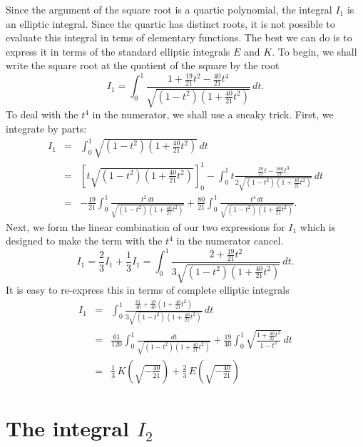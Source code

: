\documentclass[12pt]{article}
\begin{document}
Since the argument of the square root is a quartic polynomial, the integral $I_1$ is an elliptic integral.  Since the quartic has distinct roots, it is not possible to evaluate this integral in tems of elementary functions.  The best we can do is to express it in terms of the standard elliptic integrals $E$ and $K$.  To begin, we shall write the square root at the quotient of the square by the root
$$ I_1 = \int_0^1 \frac{1 + \frac{19}{21} t^2 - \frac{40}{21} t^4}
{\sqrt{\left( 1 - t^2 \right) \left( 1 + \frac{40}{21} t^2 \right)}} \, dt.$$
To deal with the $t^4$ in the numerator, we shall use a sneaky trick.  First, we integrate by parts:
\begin{eqnarray*}
I_1 &=& \int_0^1 \sqrt{\left( 1 - t^2 \right) \left( 1 + \frac{40}{21} 
t^2 \right)} \, dt \\
&=& \left[ t \sqrt{\left( 1 - t^2 \right) \left( 1 + \frac{40}{21} t^2 \right)}
\right]_0^1 - \int_0^1 t \frac{\frac{38}{21} t - \frac{160}{21} t^3}{2\sqrt{\left( 1 - t^2 \right) \left( 1 + \frac{40}{21} t^2 \right)}} \, dt \\
 &=& - \frac{19}{21} \int_0^1 \frac{t^2 \, dt}{\sqrt{\left( 1 - t^2 \right) \left( 1 + \frac{40}{21} t^2 \right)}} + 
\frac{80}{21} \int_0^1 \frac{t^4 \, dt}{\sqrt{\left( 1 - t^2 \right) \left( 1 + \frac{40}{21} t^2 \right)}}.
\end{eqnarray*}
Next, we form the linear combination of our two expressions for $I_1$ which is designed to make the term with the $t^4$ in the numerator cancel.
 $$I_1 = \frac{2}{3} I_1 + \frac {1}{3} I_1 = \int_0^1 \frac{2 + \frac{19}{21} t^2}{3 \sqrt{ \left( 1 - t^2 \right) \left( 1 + \frac{40}{21} t^2 \right)}} \, dt.$$
It is easy to re-express this in terms of complete elliptic integrals
\begin{eqnarray*}
I_1 &=& \int_0^1 \frac{\frac{61}{40} + \frac{19}{40} \left( 1 + \frac{40}{21} t^2 \right)}{3 \sqrt{ \left( 1 - t^2 \right) \left( 1 + \frac{40}{21} t^2 \right)}} \, dt \\
&=&  \frac{61}{120} \int_0^1 \frac{dt}{\sqrt{\left( 1 - t^2 \right) \left( 1 + \frac{40}{21} t^2 \right)}} + \frac{19}{40} \int_0^1 \sqrt{\frac{1 + \frac{40}{21} t^2}{1 - t^2}} \, dt \\
&=& \frac{1}{3} \, K \left( \sqrt{-\frac{40}{21}} \right) + \frac{2}{3} \, E \left( \sqrt{-\frac{40}{21}} \right)
\end{eqnarray*}

\section{The integral $I_2$}
\end{document}
